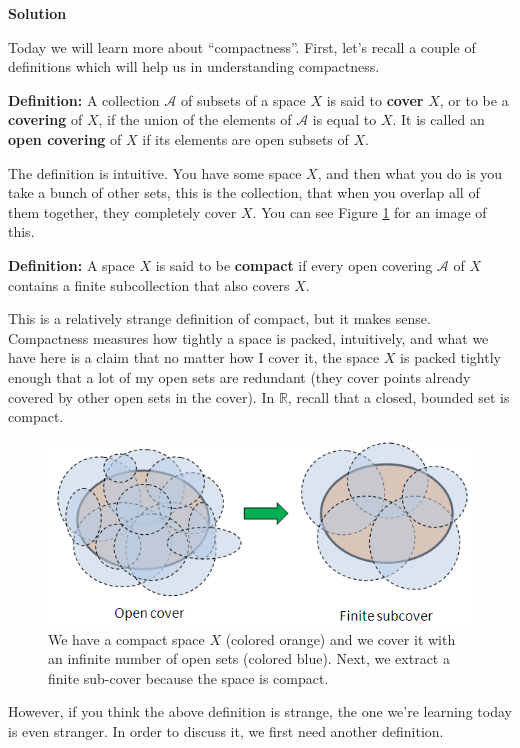 \documentclass[12pt]{article}
\newcounter{AnswerCounter}
\newcounter{SubAnswerCounter}
\newenvironment{answer}[0]{
  \setcounter{SubAnswerCounter}{1}
  \bigskip
  \textbf{Solution \arabic{AnswerCounter}}
  \\
  \begin{small}
}{
  \end{small}
  \stepcounter{AnswerCounter}
}
\begin{document}
\begin{answer}[Problem 1]
Today we will learn more about ``compactness''. First, let's recall a couple of definitions which will help us in understanding compactness.

\textbf{Definition:} A collection $\mathcal{A}$ of subsets of a space $X$ is said to \textbf{cover} $X$, or to be a \textbf{covering} of $X$, if the union of the elements of $\mathcal{A}$ is equal to $X$. It is called an \textbf{open covering} of $X$ if its elements are open subsets of $X$.

The definition is intuitive. You have some space $X$, and then what you do is you take a bunch of other sets, this is the collection, that when you overlap all of them together, they completely cover $X$. You can see Figure \ref{fig:cover} for an image of this.

\textbf{Definition:} A space $X$ is said to be \textbf{compact} if every open covering $\mathcal{A}$ of $X$ contains a finite subcollection that also covers $X$.

This is a relatively strange definition of compact, but it makes sense. Compactness measures how tightly a space is packed, intuitively, and what we have here is a claim that no matter how I cover it, the space $X$ is packed tightly enough that a lot of my open sets are redundant (they cover points already covered by other open sets in the cover). In $\mathbb{R}$, recall that a closed, bounded set is compact.

\begin{figure}[h!]
\centering
\includegraphics[scale=0.7]{compact_spaces}
\caption{We have a compact space $X$ (colored orange) and we cover it with an infinite number of open sets (colored blue). Next, we extract a finite sub-cover because the space is compact.}
\label{fig:cover}
\end{figure}

However, if you think the above definition is strange, the one we're learning today is even stranger. In order to discuss it, we first need another definition.


\end{answer}
\end{document}
